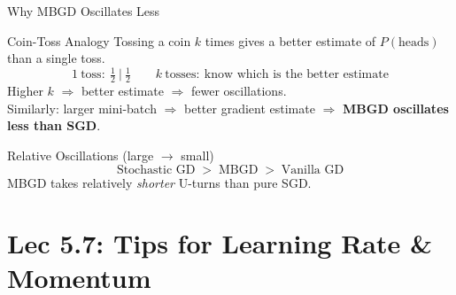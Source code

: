 \documentclass{beamer}
\begin{document}
\begin{frame}[shrink=10]{Why MBGD Oscillates Less}
  \begin{exampleblock}{Coin-Toss Analogy}
    Tossing a coin $k$ times gives a better estimate of $P(\text{heads})$
    than a single toss.
    \[
      1\ \text{toss}:\ \tfrac{1}{2}\ \big|\ \tfrac{1}{2}
      \qquad
      k\ \text{tosses}:\ \text{know which is the better estimate}
    \]
    Higher $k$ $\Rightarrow$ better estimate $\Rightarrow$ fewer
    oscillations.\\[6pt]
    Similarly: larger mini-batch $\Rightarrow$ better gradient estimate
    $\Rightarrow$ \textbf{MBGD oscillates less than SGD}.
  \end{exampleblock}

  \medskip

  \begin{block}{Relative Oscillations (large $\to$ small)}
    \[
      \text{Stochastic GD} \;>\; \text{MBGD} \;>\; \text{Vanilla GD}
    \]
    MBGD takes relatively \emph{shorter} U-turns than pure SGD.
  \end{block}
\end{frame}

\section{Lec 5.7: Tips for Learning Rate \& Momentum}
\end{document}
